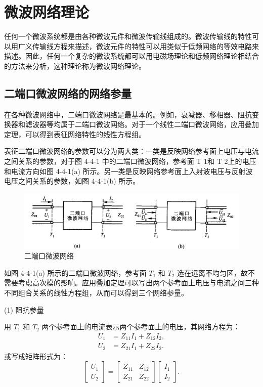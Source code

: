 \section{微波网络理论}

任何一个微波系统都是由各种微波元件和微波传输线组成的。微波传输线的特性可以用广义传输线方程来描述，微波元件的特性可以用类似于低频网络的等效电路来描述。因此，任何一个复杂的微波系统都可以用电磁场理论和低频网络理论相结合的方法来分析，这种理论称为微波网络理论。

\subsection{二端口微波网络的网络参量}

在各种微波网络中，二端口微波网络是最基本的。例如，衰减器、移相器、阻抗变换器和滤波器等均属于二端口微波网络。对于一个线性二端口微波网络，应用叠加定理，可以得到表征网络特性的线性方程组。

表征二端口微波网络的参数可以分为两大类：一类是反映网络参考面上电压与电流之间关系的参数，对于图 4-4-1 中的二端口微波网络，参考面 T 1​和 T 2​上的电压和电流方向如图 4-4-1(a) 所示。另一类是反映网络参考面上入射波电压与反射波电压之间关系的参数，如图 4-4-1(b) 所示。

\begin{figure}
	\centering
	\includegraphics[width=0.7\linewidth]{img/4-3}
	\caption{二端口微波网络}
	\label{fig:4-3}
\end{figure}

如图 4-4-1(a) 所示的二端口微波网络，参考面 \( T_1 \) 和 \( T_2 \) 选在远离不均匀区，故不需要考虑高次模的影响。应用叠加定理可以写出两个参考面上电压与电流之间三种不同组合关系的线性方程组，从而可以得到三个网络参量。

(1) 阻抗参量

用 \( T_1 \) 和 \( T_2 \) 两个参考面上的电流表示两个参考面上的电压，其网络方程为：
\begin{equation}
	\begin{aligned}
		U_1 &= Z_{11} I_1 + Z_{12} I_2, \\
		U_2 &= Z_{21} I_1 + Z_{22} I_2.
	\end{aligned}
	\tag{4-4-1a}
\end{equation}
或写成矩阵形式为：
\begin{equation}
	\begin{bmatrix}
		U_1 \\
		U_2
	\end{bmatrix}
	=
	\begin{bmatrix}
		Z_{11} & Z_{12} \\
		Z_{21} & Z_{22}
	\end{bmatrix}
	\begin{bmatrix}
		I_1 \\
		I_2
	\end{bmatrix}.
	\tag{4-4-1b}
\end{equation}

